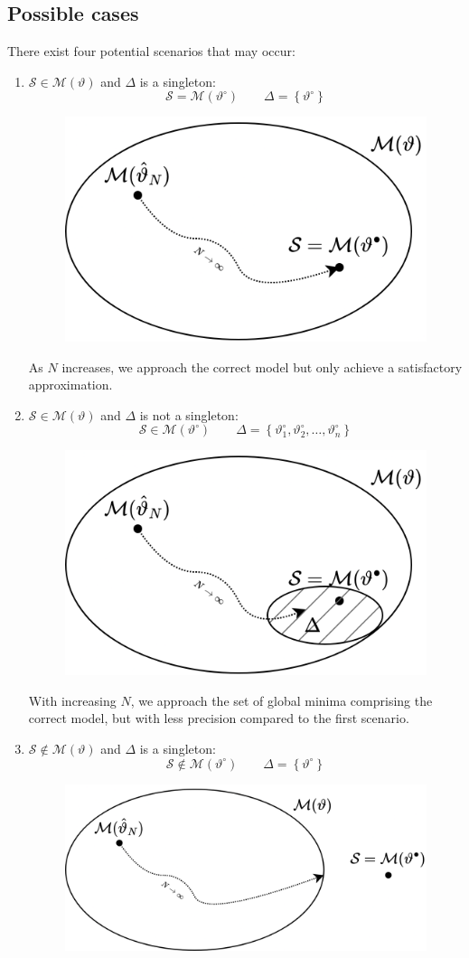 \subsection{Possible cases}
There exist four potential scenarios that may occur:
\begin{enumerate}
    \item $\mathcal{S} \in \mathcal{M}(\vartheta)$ and $\Delta$ is a singleton: 
        \[\mathcal{S}=\mathcal{M}(\vartheta^\circ)  \qquad \Delta=\left\{ \vartheta^\circ \right\}\]
        \begin{figure}[H]
            \centering
            \includegraphics[width=0.4\linewidth]{images/one.png}
        \end{figure}
        As $N$ increases, we approach the correct model but only achieve a satisfactory approximation.
    \item $\mathcal{S} \in \mathcal{M}(\vartheta)$ and $\Delta$ is not a singleton:    
        \[\mathcal{S}\in\mathcal{M}(\vartheta^\circ)  \qquad \Delta=\left\{ \vartheta^\circ_1,\vartheta^\circ_2,\dots,\vartheta^\circ_n \right\}\]
        \begin{figure}[H]
            \centering
            \includegraphics[width=0.4\linewidth]{images/two.png}
        \end{figure}
        With increasing $N$, we approach the set of global minima comprising the correct model, but with less precision compared to the first scenario.
    \item $\mathcal{S} \notin \mathcal{M}(\vartheta)$ and $\Delta$ is a singleton: 
        \[\mathcal{S}\notin\mathcal{M}(\vartheta^\circ)  \qquad \Delta=\left\{ \vartheta^\circ \right\}\]
        \begin{figure}[H]
            \centering
            \includegraphics[width=0.55\linewidth]{images/three.png}

\end{figure}
\end{enumerate}
